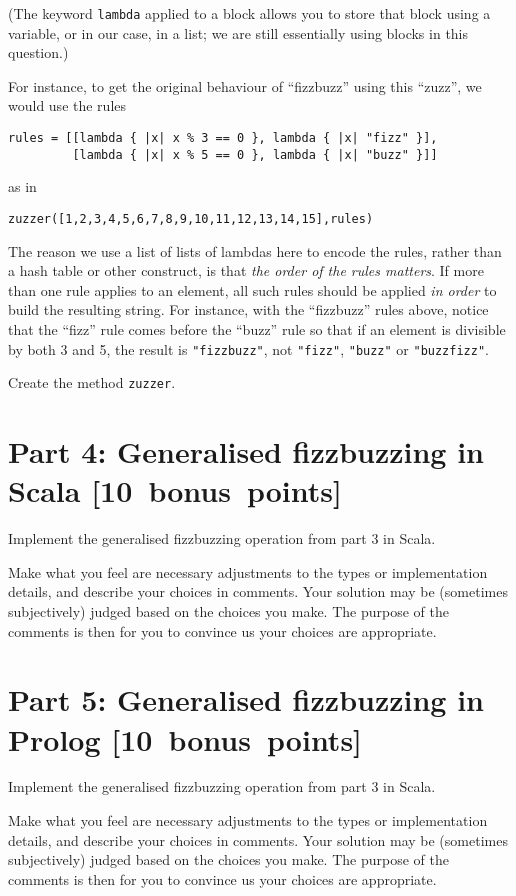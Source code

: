 \documentclass[11pt]{article}
\begin{document}
(The keyword \texttt{lambda} applied to a block allows you to store
that block using a variable, or in our case, in a list;
we are still essentially using blocks in this question.)

For instance, to get the original behaviour of “fizzbuzz”
using this “zuzz”, we would use the rules
\begin{verbatim}
rules = [[lambda { |x| x % 3 == 0 }, lambda { |x| "fizz" }],
         [lambda { |x| x % 5 == 0 }, lambda { |x| "buzz" }]]
\end{verbatim}
as in
\begin{verbatim}
zuzzer([1,2,3,4,5,6,7,8,9,10,11,12,13,14,15],rules)
\end{verbatim}

The reason we use a list of lists of lambdas here to encode the rules,
rather than a hash table or other construct,
is that \emph{the order of the rules matters}.
If more than one rule applies to an element, all such rules
should be applied \emph{in order} to build the resulting string.
For instance, with the “fizzbuzz” rules above, notice
that the “fizz” rule comes before the “buzz” rule
so that if an element is divisible by both 3 and 5,
the result is \texttt{"fizzbuzz"}, not \texttt{"fizz"}, \texttt{"buzz"} or \texttt{"buzzfizz"}.

Create the method \texttt{zuzzer}.

\section*{Part 4: Generalised fizzbuzzing in Scala                [10 bonus points]}
\label{sec:org9e6eda4}
Implement the generalised fizzbuzzing operation from part 3 in Scala.

Make what you feel are necessary adjustments to the types or
implementation details, and describe your choices in comments.
Your solution may be (sometimes subjectively) judged based on
the choices you make. The purpose of the comments is then
for you to convince us your choices are appropriate.

\section*{Part 5: Generalised fizzbuzzing in Prolog               [10 bonus points]}
\label{sec:orgae49a86}
Implement the generalised fizzbuzzing operation from part 3 in Scala.

Make what you feel are necessary adjustments to the types or
implementation details, and describe your choices in comments.
Your solution may be (sometimes subjectively) judged based on
the choices you make. The purpose of the comments is then
for you to convince us your choices are appropriate.
\end{document}
